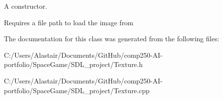 A constructor. 

Requires a file path to load the image from 

The documentation for this class was generated from the following files\+:\begin{DoxyCompactItemize}
\item 
C\+:/\+Users/\+Alastair/\+Documents/\+Git\+Hub/comp250-\/\+A\+I-\/portfolio/\+Space\+Game/\+S\+D\+L\+\_\+project/Texture.\+h\item 
C\+:/\+Users/\+Alastair/\+Documents/\+Git\+Hub/comp250-\/\+A\+I-\/portfolio/\+Space\+Game/\+S\+D\+L\+\_\+project/Texture.\+cpp\end{DoxyCompactItemize}
